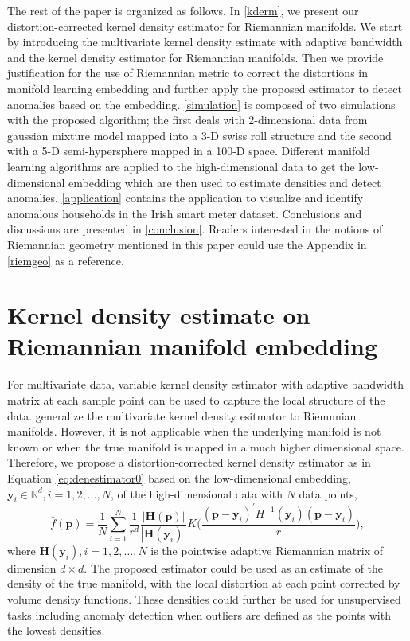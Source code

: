 \documentclass[11pt,a4paper,]{article}
\begin{document}
The rest of the paper is organized as follows. In \autoref{kderm}, we present our distortion-corrected kernel density estimator for Riemannian manifolds. We start by introducing the multivariate kernel density estimate with adaptive bandwidth and the kernel density estimator for Riemannian manifolds. Then we provide justification for the use of Riemannian metric to correct the distortions in manifold learning embedding and further apply the proposed estimator to detect anomalies based on the embedding. \autoref{simulation} is composed of two simulations with the proposed algorithm; the first deals with 2-dimensional data from gaussian mixture model mapped into a 3-D swiss roll structure and the second with a 5-D semi-hypersphere mapped in a 100-D space. Different manifold learning algorithms are applied to the high-dimensional data to get the low-dimensional embedding which are then used to estimate densities and detect anomalies.
\autoref{application} contains the application to visualize and identify anomalous households in the Irish smart meter dataset. Conclusions and discussions are presented in \autoref{conclusion}. Readers interested in the notions of Riemannian geometry mentioned in this paper could use the Appendix in \autoref{riemgeo} as a reference.

\hypertarget{kderm}{%
\section{Kernel density estimate on Riemannian manifold embedding}\label{kderm}}

For multivariate data, variable kernel density estimator with adaptive bandwidth matrix at each sample point can be used to capture the local structure of the data. \textcite{Pelletier2005-vu} generalize the multivariate kernel density esitmator to Riemnnian manifolds. However, it is not applicable when the underlying manifold is not known or when the true manifold is mapped in a much higher dimensional space. Therefore, we propose a distortion-corrected kernel density estimator as in Equation \eqref{eq:denestimator0} based on the low-dimensional embedding, \(\pmb{y}_i \in \mathbb{R}^d, i = 1, 2, \dots, N\), of the high-dimensional data with \(N\) data points,
\begin{equation}
\label{eq:denestimator0}
\hat{f}(\pmb{p}) = \frac{1}{N} \sum_{i=1}^{N} \frac{1}{r^d} \frac{|\pmb{H}(\pmb{p})|}{|\pmb{H}(\pmb{y}_i)|} K\bigg( \frac{(\pmb{p} - \pmb{y}_i)^\prime H^{-1}(\pmb{y}_i) (\pmb{p} - \pmb{y}_i)}{r} \bigg),
\end{equation}
where \(\pmb{H}(\pmb{y}_i), i = 1, 2, \dots, N\) is the pointwise adaptive Riemannian matrix of dimension \(d \times d\).
The proposed estimator could be used as an estimate of the density of the true manifold, with the local distortion at each point corrected by volume density functions. These densities could further be used for unsupervised tasks including anomaly detection when outliers are defined as the points with the lowest densities.
\end{document}
